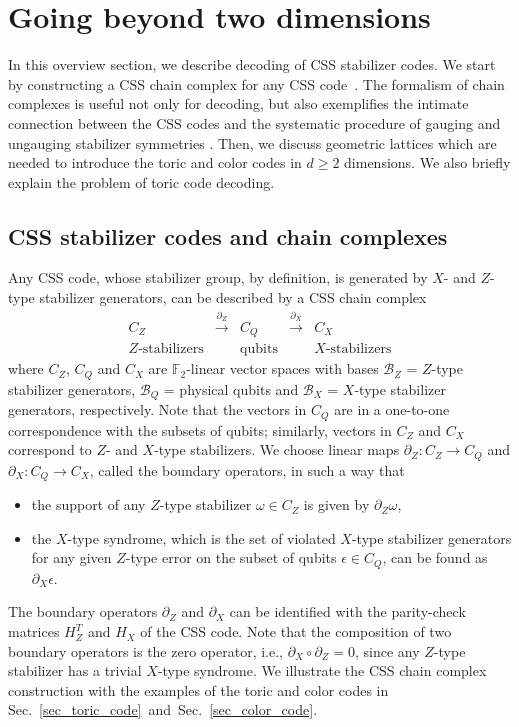 \documentclass[onecolumn,letterpaper,11pt,accepted=2022-12-19]{quantumarticle}
\theoremstyle{definition}
\theoremstyle{lemma}
\theoremstyle{theorem}
\theoremstyle{corollary}
\begin{document}
\section{Going beyond two dimensions}
\label{sec_basics}


In this overview section, we describe decoding of CSS stabilizer codes.
We start by constructing a CSS chain complex for any CSS code~\cite{Delfosse2014,Bravyi2013b}.
The formalism of chain complexes is useful not only for decoding, but also exemplifies the intimate connection between the CSS codes and the systematic procedure of gauging and ungauging stabilizer symmetries \cite{Kubica2018}.
Then, we discuss geometric lattices which are needed to introduce the toric and color codes in $d\geq 2$ dimensions.
We also briefly explain the problem of toric code decoding.


\subsection{CSS stabilizer codes and chain complexes} 

Any CSS code, whose stabilizer group, by definition, is generated by $X$- and $Z$-type stabilizer generators, can be described by a CSS chain complex
\begin{equation} 
\begin{array}{ccccc}
C_Z & \xrightarrow{\partial_Z} & C_Q & \xrightarrow{\partial_X} & C_X\\
Z\textrm{-stabilizers} & & \mathrm{qubits} & & X\textrm{-stabilizers}
\end{array}
\label{eq_chain}
\end{equation}
where $C_Z$, $C_Q$ and $C_X$ are $\mathbb{F}_2$-linear vector spaces with bases $\mathcal{B}_Z$ = $Z$-type stabilizer generators, $\mathcal{B}_Q$ = physical qubits and $\mathcal{B}_X$ = $X$-type stabilizer generators, respectively.
Note that the vectors in $C_Q$ are in a one-to-one correspondence with the subsets of qubits; similarly, vectors in $C_Z$ and $C_X$ correspond to $Z$- and $X$-type stabilizers.
We choose linear maps $\partial_Z: C_Z \rightarrow C_Q$ and $\partial_X : C_Q \rightarrow C_X$, called the boundary operators, in such a way that
\begin{itemize}
\item the support of any $Z$-type stabilizer $\omega\in C_Z$ is given by $\partial_Z \omega$,
\item the $X$-type syndrome, which is the set of violated $X$-type stabilizer generators for any given $Z$-type error on the subset of qubits $\epsilon\in C_Q$, can be found as $\partial_X \epsilon$.
\end{itemize}
The boundary operators $\partial_Z$ and $\partial_X$ can be identified with the parity-check matrices $H^T_Z$ and $H_X$ of the CSS code.
Note that the composition of two boundary operators is the zero operator, i.e., $\partial_X\circ\partial_Z = 0$, since any $Z$-type stabilizer has a trivial $X$-type syndrome.
We illustrate the CSS chain complex construction with the examples of the toric and color codes in Sec.~\ref{sec_toric_code}~and~Sec.~\ref{sec_color_code}.
\end{document}
